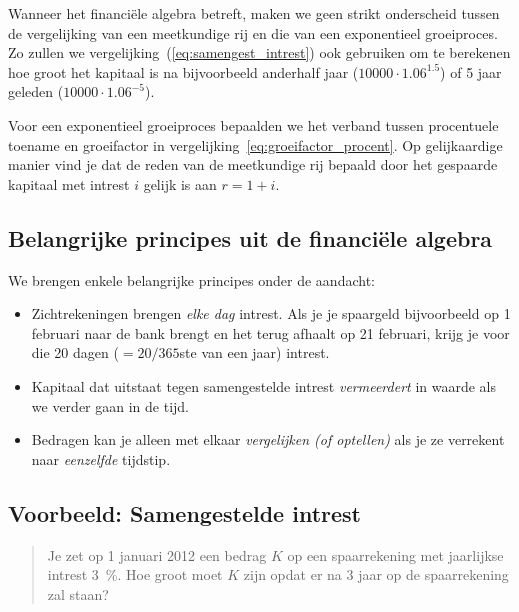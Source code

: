 Wanneer het financi\"ele algebra betreft, maken we geen strikt onderscheid tussen de vergelijking van een meetkundige rij en die van een exponentieel groeiproces. Zo zullen we vergelijking~(\ref{eq:samengest_intrest}) ook gebruiken om te berekenen hoe groot het kapitaal is na bijvoorbeeld anderhalf jaar ($\num{10000}\cdot \num{1.06}^{\num{1.5}}$) of 5 jaar geleden ($\num{10000}\cdot \num{1.06}^{-5}$). 

Voor een exponentieel groeiproces bepaalden we het verband tussen procentuele toename en groeifactor in vergelijking~\eqref{eq:groeifactor_procent}. Op gelijkaardige manier vind je dat de reden van de meetkundige rij bepaald door het gespaarde kapitaal met intrest $i$ gelijk is aan $r=1+i$. 

\subsection{Belangrijke principes uit de financi\"{e}le
algebra}\label{sec.principes}
We brengen enkele belangrijke principes onder de aandacht:
\begin{itemize}
       \item Zichtrekeningen brengen \textit{elke dag} intrest. Als je je spaargeld bijvoorbeeld op 1 februari naar de bank brengt en het terug afhaalt op 21 februari, krijg je voor die 20 dagen ($=20/365$ste van een jaar) intrest.
    \item Kapitaal dat uitstaat tegen samengestelde intrest
      \emph{vermeerdert} in waarde als we verder gaan in de tijd.
       \item Bedragen kan je alleen met elkaar \emph{vergelijken (of optellen)}
       als je ze
       verrekent naar \emph{eenzelfde} tijdstip.
   \end{itemize}

\subsection{Voorbeeld: Samengestelde intrest}
\begin{quote}
Je zet op 1 januari 2012 een bedrag $K$ op een spaarrekening met jaarlijkse intrest \SI{3}{\percent}. Hoe groot moet $K$ zijn opdat er na 3 jaar  op de spaarrekening zal staan?
\end{quote}
